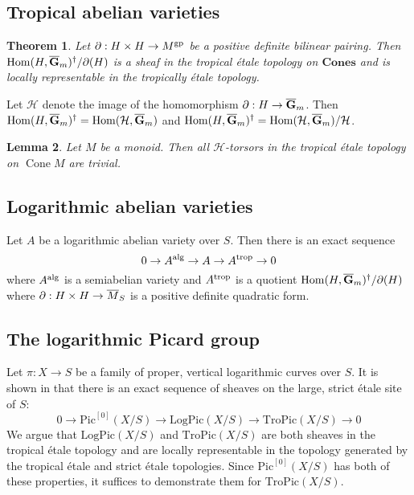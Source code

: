 \documentclass[12pt]{amsart}
\newtheorem{theorem}{Theorem}
\newtheorem{lemma}[theorem]{Lemma}
\theoremstyle{definition}
\theoremstyle{remark}
\def\Hom{\operatorname{Hom}}
\def\Cone{\operatorname{Cone}}
\def\Cones{\mathbf{Cones}}
\def\Pic{\mathrm{Pic}}
\def\LogPic{\mathrm{LogPic}}
\def\TroPic{\mathrm{TroPic}}
\def\overnorm#1{\overline{#1}\vphantom{#1}}
\def\ologGm{\overnorm{\mathbf G}_m}
\begin{document}
\subsection{Tropical abelian varieties}

\begin{theorem}
Let $\partial : H \times H \to M^{\rm gp}$ be a positive definite bilinear pairing.  Then $\Hom(H, \ologGm)^\dagger / \partial(H)$ is a sheaf in the tropical \'etale topology on $\Cones$ and is locally representable in the tropically \'etale topology.
\end{theorem}

Let $\mathcal H$ denote the image of the homomorphism $\partial : H \to \ologGm$.  Then $\Hom(H, \ologGm)^\dagger = \Hom(\mathcal H, \ologGm)$ and $\Hom(H, \ologGm)^\dagger = \Hom(\mathcal H, \ologGm) / \mathcal H$.

\begin{lemma}
Let $M$ be a monoid.  Then all $\mathcal H$-torsors in the tropical \'etale topology on $\Cone M$ are trivial.
\end{lemma}


\subsection{Logarithmic abelian varieties}

Let $A$ be a logarithmic abelian variety over $S$.  Then there is an exact sequence
\begin{equation}
0 \to A^{\rm alg} \to A \to A^{\rm trop} \to 0
\end{equation}
where $A^{\rm alg}$ is a semiabelian variety and $A^{\rm trop}$ is a quotient $\Hom(H, \ologGm)^\dagger / \partial(H)$ where $\partial : H \times H \to \overnorm M_S$ is a positive definite quadratic form. 

 
\subsection{The logarithmic Picard group}

Let $\pi : X \to S$ be a family of proper, vertical logarithmic curves over $S$.  It is shown in \cite{logpic} that there is an exact sequence of sheaves on the large, strict \'etale site of $S$:
\begin{equation} 
0 \to \Pic^{[0]}(X/S) \to \LogPic(X/S) \to \TroPic(X/S) \to 0
\end{equation}
We argue that $\LogPic(X/S)$ and $\TroPic(X/S)$ are both sheaves in the tropical \'etale topology and are locally representable in the topology generated by the tropical \'etale and strict \'etale topologies.  Since $\Pic^{[0]}(X/S)$ has both of these properties, it suffices to demonstrate them for $\TroPic(X/S)$.
\end{document}

